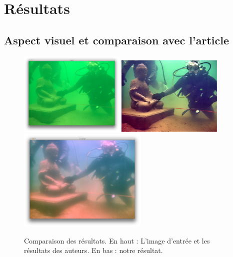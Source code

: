 \documentclass[twoside]{article}
\begin{document}
\section{Résultats}
\subsection{Aspect visuel et comparaison avec l'article}

\begin{figure}[H]
  \centering
  \includegraphics[width=0.45\textwidth]{Support/input.png}
  \includegraphics[width=0.45\textwidth]{Support/theirs.png}
  \includegraphics[width=0.55\textwidth]{Support/ours.png}
  \caption{Comparaison des résultats. En haut : L'image d'entrée et les résultats des auteurs. En bas : notre résultat.}
\end{figure}
\end{document}
